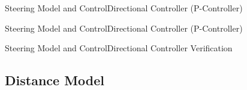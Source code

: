 \begin{frame}{Steering Model and Control}{Directional Controller (P-Controller)}
    \begin{figure}[H]
    \centering
  \end{figure}
\end{frame}


\begin{frame}{Steering Model and Control}{Directional Controller (P-Controller)}
  \begin{figure}[H]
      \centering
  \end{figure}
\end{frame}

\begin{frame}{Steering Model and Control}{Directional Controller Verification}
  \begin{figure}[H]
    \centering
  \end{figure}
\end{frame}


\subsection{Distance Model}

